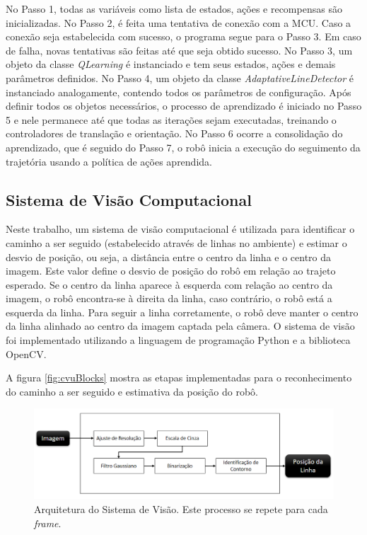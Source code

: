 \documentclass[a4paper]{ifacconf}
\begin{document}
No Passo 1, todas as variáveis como lista de estados, ações e recompensas são inicializadas. No Passo 2, é feita uma tentativa de conexão com a MCU. Caso a conexão seja estabelecida com sucesso, o programa segue para o Passo 3. Em caso de falha, novas tentativas são feitas até que seja obtido sucesso. No Passo 3, um objeto da classe \textit{QLearning} é instanciado e tem seus estados, ações e demais parâmetros definidos. No Passo 4, um objeto da classe \textit{AdaptativeLineDetector} é instanciado analogamente, contendo todos os parâmetros de configuração. Após definir todos os objetos necessários, o processo de aprendizado  é iniciado no Passo 5 e nele permanece até que todas as iterações sejam executadas, treinando o controladores de translação e orientação. No Passo 6 ocorre a consolidação do aprendizado, que é seguido do Passo 7, o robô inicia a execução do seguimento da trajetória usando a política de ações aprendida.

\subsection{Sistema de Visão Computacional}

Neste trabalho, um sistema de visão computacional é utilizada para identificar o caminho a ser seguido (estabelecido através de linhas no ambiente) e estimar o desvio de posição, ou seja, a distância entre o centro da linha e o centro da imagem. Este valor define o desvio de posição do robô em relação ao trajeto esperado. Se o centro da linha aparece à esquerda com relação ao centro da imagem, o robô encontra-se à direita da linha, caso contrário, o robô está a esquerda da linha. Para seguir a linha corretamente, o robô deve manter o centro da linha alinhado ao centro da imagem captada pela câmera. O sistema de visão foi implementado utilizando a linguagem de programação Python e a biblioteca OpenCV. 

A figura \autoref{fig:cvuBlocks} mostra as etapas implementadas para o reconhecimento do caminho a ser seguido e estimativa da posição do robô.  

\begin{figure}
\centering 
\caption{Arquitetura do Sistema de Visão. Este processo se repete para cada \textit{frame}.}  \label{fig:cvuBlocks}
\includegraphics[scale=0.33]{Figuras/cvuBlocks.png}
\end{figure}
\end{document}
